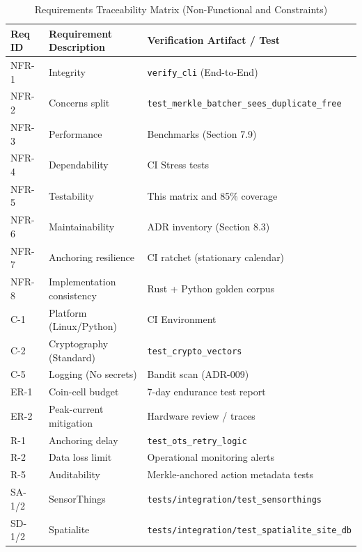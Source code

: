 \begin{table}[H]
\centering
\small
\caption{Requirements Traceability Matrix (Non-Functional and Constraints)}
\label{tab:req-traceability-non-fun}
\begin{tabularx}{\textwidth}{|l|>{\raggedright\arraybackslash}X|l|}
\hline
\textbf{Req ID} & \textbf{Requirement Description} & \textbf{Verification Artifact / Test} \\ \hline
NFR-1 & Integrity                      & \texttt{verify\_cli} (End-to-End) \\ \hline
NFR-2 & Concerns split                 & \texttt{test\_merkle\_batcher\_sees\_duplicate\_free} \\ \hline
NFR-3 & Performance                    & Benchmarks (Section 7.9) \\ \hline
NFR-4 & Dependability                  & \ac{CI} Stress tests \\ \hline
NFR-5 & Testability                    & This matrix and 85\% coverage \\ \hline
NFR-6 & Maintainability                & \ac{ADR} inventory (Section 8.3) \\ \hline
NFR-7 & Anchoring resilience           & \ac{CI} ratchet (stationary calendar) \\ \hline
NFR-8 & Implementation consistency      & Rust + Python golden corpus \\ \hline
C-1   & Platform (Linux/Python)        & \ac{CI} Environment \\ \hline
C-2   & Cryptography (Standard)        & \texttt{test\_crypto\_vectors} \\ \hline
C-5   & Logging (No secrets)           & Bandit scan (\ac{ADR}-009) \\ \hline
ER-1  & Coin-cell budget               & 7-day endurance test report \\ \hline
ER-2  & Peak-current mitigation        & Hardware review / traces \\ \hline
R-1   & Anchoring delay                & \texttt{test\_ots\_retry\_logic} \\ \hline
R-2   & Data loss limit                & Operational monitoring alerts \\ \hline
R-5   & Auditability                   & Merkle-anchored action metadata tests \\ \hline
SA-1/2& SensorThings                   & \texttt{tests/integration/test\_sensorthings} \\ \hline
SD-1/2& Spatialite                     & \texttt{tests/integration/test\_spatialite\_site\_db} \\ \hline
\end{tabularx}
\end{table}
